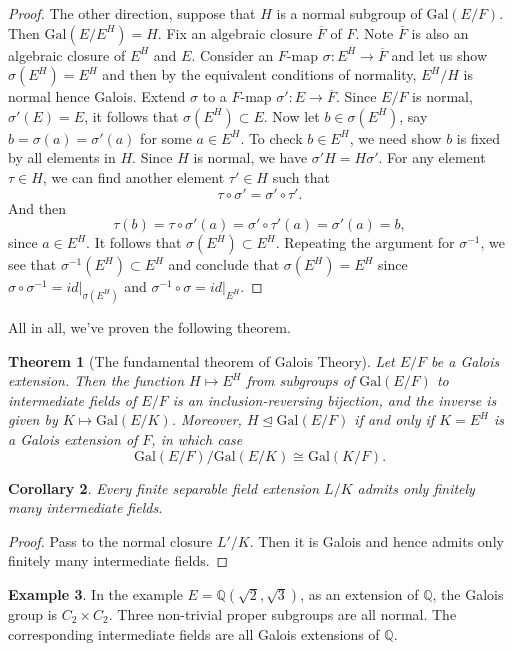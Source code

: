 \documentclass[12pt]{report}
\newtheorem{thm}{Theorem}[section]
\newtheorem{cor}[thm]{Corollary}
\theoremstyle{definition}
\newtheorem{example}[thm]{Example}
\def\QQ{\mathbb{Q}}
\def\Gal{\text{Gal}}
\begin{document}
\begin{proof}
    The other direction, suppose that $H$ is a normal subgroup of $\Gal(E/F)$. Then $\Gal(E/E^H) = H$. Fix an algebraic closure $\overline{F}$ of $F$. Note $\overline{F}$ is also an algebraic closure of $E^H$ and $E$. Consider an $F$-map $\sigma: E^H\to \overline{F}$ and let us show $\sigma(E^H)=E^H$ and then by the equivalent conditions of normality, $E^H/H$ is normal hence Galois. Extend $\sigma$ to a $F$-map $\sigma': E\to \overline{F}$. Since $E/F$ is normal, $\sigma'(E)=E$, it follows that $\sigma(E^H)\subset E$. Now let $b\in \sigma(E^H)$, say $b=\sigma(a)=\sigma'(a)$ for some $a\in E^H$. To check $b\in E^H$, we need show $b$ is fixed by all elements in $H$. Since $H$ is normal, we have $\sigma' H=H\sigma'$. For any element $\tau\in H$, we can find another element $\tau'\in H$ such that $$\tau \circ \sigma' =\sigma'\circ \tau'.$$
    And then $$\tau(b)=\tau\circ\sigma'(a)=\sigma'\circ \tau'(a)= \sigma'(a)=b,$$ since $a\in E^H$. It follows that $\sigma(E^H)\subset E^H$. Repeating the argument for $\sigma^{-1}$, we see that $\sigma^{-1}(E^H)\subset E^H$  and conclude that $\sigma(E^H)=E^H$ since $\sigma\circ\sigma^{-1} =id|_{\sigma(E^H)}$ and $\sigma^{-1}\circ \sigma=id|_{E^H}$.
\end{proof}

All in all, we've proven the following theorem.

\begin{thm}[The fundamental theorem of Galois Theory]\label{galois}
    Let $E/F$ be a Galois extension. Then the function $H \mapsto E^H$ from subgroups of $\Gal(E/F)$ to intermediate fields of $E/F$ is an inclusion-reversing bijection, and the inverse is given by $K \mapsto \Gal(E/K)$. Moreover, $H \trianglelefteq \Gal(E/F)$ if and only if $K = E^H$ is a Galois extension of $F$, in which case $$\Gal(E/F)/\Gal(E/K) \cong \Gal(K/F).$$
\end{thm}

\begin{cor}
    Every finite separable field extension $L/K$ admits only finitely many intermediate fields.
\end{cor}

\begin{proof}
    Pass to the normal closure $L'/K$. Then it is Galois and hence admits only finitely many intermediate fields. 
\end{proof}

\begin{example}
    In the example $E=\QQ(\sqrt{2},\sqrt{3})$, as an extension of $\QQ$, the Galois group is $C_2\times C_2$. Three non-trivial proper subgroups are all normal. The corresponding intermediate fields are all Galois extensions of $\QQ$.
\end{example}
\end{document}
